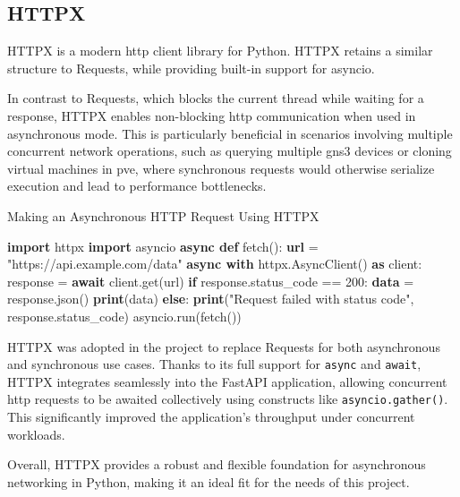 \subsection{HTTPX}

HTTPX\cite{httpx2025} is a modern \ac{http} client library for Python. HTTPX retains a similar structure to 
Requests, while providing  built-in support for asyncio.

In contrast to Requests, which blocks the current thread while waiting for a response, HTTPX enables non-blocking 
\ac{http} communication when used in asynchronous mode. This is particularly beneficial in scenarios involving multiple 
concurrent network operations, such as querying multiple \ac{gns3} devices or cloning virtual machines in \ac{pve}, 
where synchronous requests would otherwise serialize execution and lead to performance bottlenecks.

\begin{algorithm}
  \caption{Making an Asynchronous HTTP Request Using HTTPX}\label{httpx-basic}
  \begin{algorithmic}[1]
    \State \textbf{import} httpx
    \State \textbf{import} asyncio
    \State
    \State \textbf{async def} fetch():
    \State \hspace{1em} \textbf{url} = "https://api.example.com/data"
    \State \hspace{1em} \textbf{async with} httpx.AsyncClient() \textbf{as} client:
    \State \hspace{2em} response = \textbf{await} client.get(url)
    \State \hspace{2em} \textbf{if} response.status\_code == 200:
    \State \hspace{3em} \textbf{data} = response.json()
    \State \hspace{3em} \textbf{print}(data)
    \State \hspace{2em} \textbf{else}:
    \State \hspace{3em} \textbf{print}("Request failed with status code", response.status\_code)
    \State
    \State asyncio.run(fetch())
  \end{algorithmic}
\end{algorithm}

HTTPX was adopted in the project to replace Requests for both asynchronous and synchronous use cases. Thanks to its full 
support for \texttt{async} and \texttt{await}, HTTPX integrates seamlessly into the FastAPI application, allowing 
concurrent \ac{http} requests to be awaited collectively using constructs like \texttt{asyncio.gather()}. This significantly 
improved the application's throughput under concurrent workloads.

Overall, HTTPX provides a robust and flexible foundation for asynchronous networking in Python, making it an ideal 
fit for the needs of this project.

